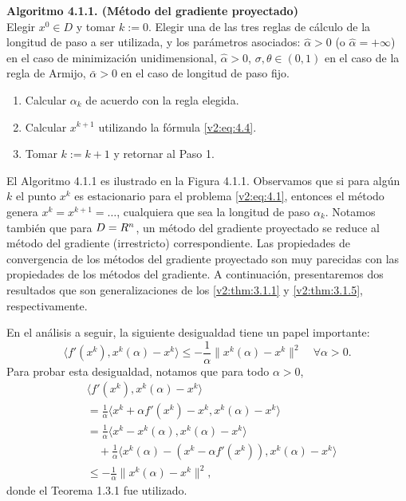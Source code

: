 \noindent \textbf{Algoritmo 4.1.1. (Método del gradiente proyectado)} \\
Elegir $x^0 \in D$ y tomar $k := 0$. Elegir una de las tres reglas de cálculo de la longitud de paso a ser utilizada, y los parámetros asociados: $\hat{\alpha} > 0$ (o $\hat{\alpha} = +\infty$) en el caso de minimización unidimensional, $\hat{\alpha} > 0$, $\sigma, \theta \in (0,1)$ en el caso de la regla de Armijo, $\bar{\alpha} > 0$ en el caso de longitud de paso fijo.
\begin{enumerate}
    \item Calcular $\alpha_k$ de acuerdo con la regla elegida.
    \item Calcular $x^{k+1}$ utilizando la fórmula \eqref{v2:eq:4.4}.
    \item Tomar $k := k + 1$ y retornar al Paso 1.
\end{enumerate}

El Algoritmo 4.1.1 es ilustrado en la Figura 4.1.1.
Observamos que si para algún $k$ el punto $x^k$ es estacionario para el problema \eqref{v2:eq:4.1}, entonces el método genera $x^k = x^{k+1} = \dots$, cualquiera que sea la longitud de paso $\alpha_k$. Notamos también que para $D = R^n$, un método del gradiente proyectado se reduce al método del gradiente (irrestricto) correspondiente. Las propiedades de convergencia de los métodos del gradiente proyectado son muy parecidas con las propiedades de los métodos del gradiente. A continuación, presentaremos dos resultados que son generalizaciones de los \cref{v2:thm:3.1.1} y \cref{v2:thm:3.1.5}, respectivamente.

En el análisis a seguir, la siguiente desigualdad tiene un papel importante:
\begin{equation}
    \langle f'(x^k), x^k(\alpha) - x^k \rangle \le -\frac{1}{\alpha} \|x^k(\alpha) - x^k\|^2 \quad \forall \alpha > 0.
    \label{v2:eq:4.7}
\end{equation}
Para probar esta desigualdad, notamos que para todo $\alpha > 0$,
\begin{align*}
    &\langle f'(x^k), x^k(\alpha) - x^k \rangle \\
    &= \frac{1}{\alpha} \langle x^k + \alpha f'(x^k) - x^k, x^k(\alpha) - x^k \rangle \\
    &= \frac{1}{\alpha} \langle x^k - x^k(\alpha), x^k(\alpha) - x^k \rangle \\
    &\quad + \frac{1}{\alpha} \langle x^k(\alpha) - (x^k - \alpha f'(x^k)), x^k(\alpha) - x^k \rangle \\
    &\le -\frac{1}{\alpha} \|x^k(\alpha) - x^k\|^2,
\end{align*}
donde el Teorema 1.3.1 fue utilizado.

